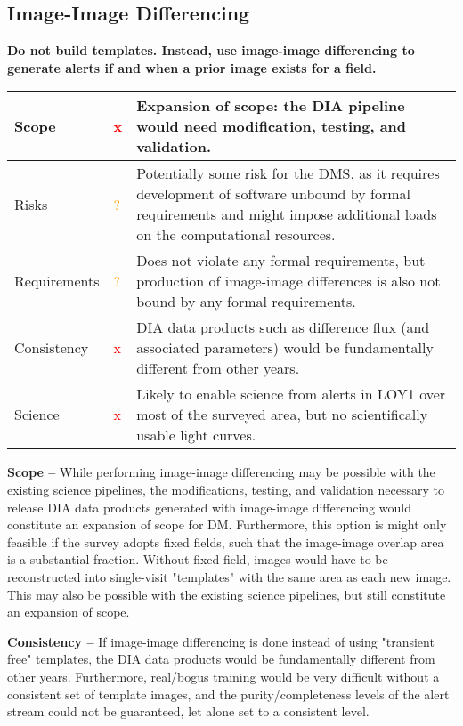 \documentclass[DM,lsstdraft,toc]{lsstdoc}
\begin{document}
\subsection{Image-Image Differencing}\label{ssec:potsol_imgimg}

{\bf Do not build templates. Instead, use image-image differencing to generate alerts if and when a prior image exists for a field.}

\begin{center}
\begin{tabular}{|p{2.5cm}|p{0.3cm}|p{13cm}|}
\hline
Scope & \textcolor{red}{x} & Expansion of scope: the DIA pipeline would need modification, testing, and validation. \\
\hline
Risks & \textcolor{orange}{?} & Potentially some risk for the DMS, as it requires development of software unbound by formal requirements and might impose additional loads on the computational resources. \\
\hline
Requirements & \textcolor{orange}{?} & Does not violate any formal requirements, but production of image-image differences is also not bound by any formal requirements. \\
\hline
Consistency & \textcolor{red}{x} & DIA data products such as difference flux (and associated parameters) would be fundamentally different from other years. \\
\hline
Science & \textcolor{red}{x} & Likely to enable science from alerts in LOY1 over most of the surveyed area, but no scientifically usable light curves. \\
\hline
\end{tabular}
\end{center}

{\bf Scope --} While performing image-image differencing may be possible with the existing science pipelines, the modifications, testing, and validation necessary to release DIA data products generated with image-image differencing would constitute an expansion of scope for DM. Furthermore, this option is might only feasible if the survey adopts fixed fields, such that the image-image overlap area is a substantial fraction. Without fixed field, images would have to be reconstructed into single-visit "templates" with the same area as each new image. This may also be possible with the existing science pipelines, but still constitute an expansion of scope.

{\bf Consistency --} If image-image differencing is done instead of using "transient free" templates, the DIA data products would be fundamentally different from other years. Furthermore, real/bogus training would be very difficult without a consistent set of template images, and the purity/completeness levels of the alert stream could not be guaranteed, let alone set to a consistent level.
\end{document}
